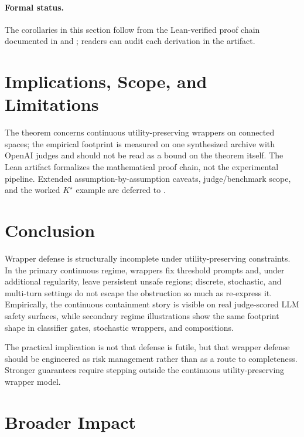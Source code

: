 \documentclass[11pt]{article}
\begin{document}
\paragraph{Formal status.}
The corollaries in this section follow from the Lean-verified proof
chain documented in  and
; readers can audit each derivation in
the artifact.


\section{Implications, Scope, and Limitations}
\label{sec:engineering}

The theorem concerns continuous utility-preserving wrappers on connected
spaces; the empirical footprint is measured on one synthesized archive
with OpenAI judges and should not be read as a bound on the theorem
itself. The Lean artifact formalizes the mathematical proof chain, not
the experimental pipeline. Extended assumption-by-assumption caveats,
judge/benchmark scope, and the worked $K^\star$ example are deferred to
.


\section{Conclusion}
\label{sec:conclusion}

Wrapper defense is structurally incomplete under utility-preserving
constraints. In the primary continuous regime, wrappers fix threshold
prompts and, under additional regularity, leave persistent unsafe
regions; discrete, stochastic, and multi-turn settings do not escape
the obstruction so much as re-express it. Empirically, the continuous
containment story is visible on real judge-scored LLM safety surfaces,
while secondary regime illustrations show the same footprint shape in
classifier gates, stochastic wrappers, and compositions.

The practical implication is not that defense is futile, but that
wrapper defense should be engineered as risk management rather than as a
route to completeness. Stronger guarantees require stepping outside the
continuous utility-preserving wrapper model.

\section*{Broader Impact}
\end{document}
